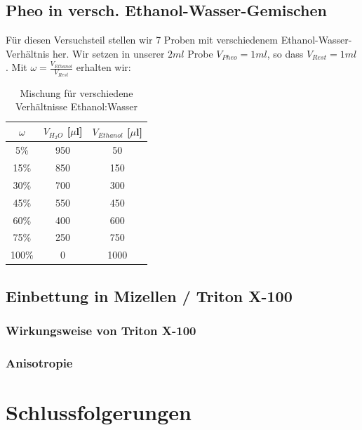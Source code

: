 \documentclass{article}
\begin{document}
\subsection{Pheo in versch. Ethanol-Wasser-Gemischen}
Für diesen Versuchsteil stellen wir 7 Proben mit verschiedenem Ethanol-Wasser-Verhältnis her.
Wir setzen in unserer $2ml$ Probe $V_{Pheo}=1ml$, so dass $V_{Rest}=1ml$. Mit $\omega= \frac{V_{Ethanol}}{V_{Rest}}$ erhalten wir:

\begin{table}[h]
  \centering
  \begin{tabular}{c|c|c}
    $\omega$ & $V_{H_2O}$ [$\mu$l] & $V_{Ethanol}$ [$\mu$l] \\
    \hline
     5\%   & 950               & 50                   \\
     15\%  & 850               & 150                  \\
     30\%  & 700               & 300                  \\
     45\%  & 550               & 450                  \\
     60\%  & 400               & 600                  \\
     75\%  & 250               & 750                  \\
     100\% & 0                 & 1000                 \\

  \end{tabular}
  \caption{Mischung für verschiedene Verhältnisse Ethanol:Wasser}
\end{table}

\subsection{Einbettung in Mizellen / Triton X-100}

\subsubsection{Wirkungsweise von Triton X-100}

\subsubsection{Anisotropie}





\section{Schlussfolgerungen}
\end{document}
